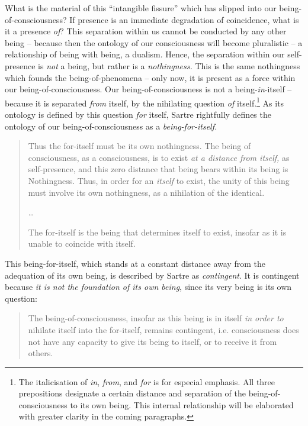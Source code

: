 What is the material of this \enquote{intangible fissure} which has slipped into our being-of-consciousness? If presence is an immediate degradation of coincidence, what is it a presence \emph{of}? This separation within us cannot be conducted by any other being -- because then the ontology of our consciousness will become pluralistic -- a relationship of being with being, a dualism.  Hence, the separation within our self-presence is \emph{not} a being, but rather is a \emph{nothingness.} This is the same nothingness which founds the being-of-phenomena -- only now, it is present as a force within our being-of-consciousness. Our being-of-consciousness is not a being-\emph{in}-itself -- because it is separated \emph{from} itself, by the nihilating question \emph{of} itself.\footnote{The italicisation of \emph{in}, \emph{from}, and \emph{for} is for especial emphasis. All three prepositions designate a certain distance and separation of the being-of-consciousness to its own being. This internal relationship will be elaborated with greater clarity in the coming paragraphs.} As its ontology is defined by this question \emph{for} itself, Sartre rightfully defines the ontology of our being-of-consciousness as a \emph{being-for-itself.}

\blockcquote[128]{Sartre}{%
    Thus the for-itself must be its own nothingness. The being of consciousness, as a consciousness, is to exist \emph{at a distance from itself,} as self-presence, and this zero distance that being bears within its being is Nothingness. Thus, in order for an \emph{itself} to exist, the unity of this being must involve its own nothingness, as a nihilation of the identical. 

    \ldots

    The for-itself is the being that determines itself to exist, insofar as it is unable to coincide with itself.
}


\noindent
This being-for-itself, which stands at a constant distance away from the adequation of its own being, is described by Sartre as \emph{contingent}. It is contingent because \emph{it is not the foundation of its own being}, since its very being is its own question:
\blockcquote[132]{Sartre}{%
    The being-of-consciousness, insofar as this being is in itself \emph{in order to} nihilate itself into the for-itself, remains contingent, i.e. consciousness does not have any capacity to give its being to itself, or to receive it from others. 
}

